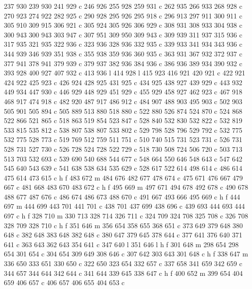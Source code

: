 {{   237 930 239 930 241 929 c
   246 926 255 928 259 931 c
   262 935 266 933 268 928 c
   270 923 274 922 282 925 c
   290 928 295 926 295 918 c
   296 913 297 911 300 911 c
   305 910 309 915 306 921 c
   305 924 305 926 306 929 c
   308 931 308 933 304 938 c
   300 943 300 943 303 947 c
   307 951 309 950 309 943 c
   309 939 311 937 315 936 c
   317 935 321 935 322 936 c
   323 936 328 936 332 935 c
   339 933 341 934 343 936 c
   344 939 346 939 351 938 c
   355 938 359 936 360 935 c
   363 931 367 932 372 937 c
   377 941 378 941 379 939 c
   379 937 382 936 384 936 c
   386 936 389 934 390 932 c
   393 928 400 927 407 932 c
   413 936 l
   414 928 l
   415 923 416 921 420 921 c
   422 921 424 922 425 923 c
   426 924 428 925 431 925 c
   434 925 438 927 439 929 c
   443 932 449 934 447 930 c
   446 929 448 929 451 929 c
   455 929 458 927 462 923 c
   467 918 468 917 474 918 c
   482 920 487 917 486 912 c
   484 907 488 903 495 903 c
   502 903 505 901 505 894 c
   505 889 513 880 518 880 c
   522 880 526 874 524 870 c
   524 868 522 866 521 865 c
   518 863 519 854 523 847 c
   528 840 532 830 532 822 c
   532 819 533 815 535 812 c
   538 807 538 807 533 802 c
   529 798 528 796 529 792 c
   532 775 532 775 528 773 c
   519 769 512 759 511 751 c
   510 740 515 731 523 731 c
   526 731 528 731 527 730 c
   526 728 524 728 522 729 c
   518 730 508 724 506 720 c
   503 713 513 703 532 693 c
   539 690 540 688 544 677 c
   548 664 550 646 548 643 c
   547 642 545 640 543 639 c
   541 638 538 634 535 629 c
   528 617 522 614 498 614 c
   486 614 475 614 473 615 c
   h f
   483 672 m
   484 676 482 677 478 674 c
   475 671 476 667 479 667 c
   481 668 483 670 483 672 c
   h f
   495 669 m
   497 671 494 678 492 678 c
   490 678 488 677 487 676 c
   486 674 486 673 488 670 c
   491 667 493 666 495 669 c
   h f
   444 697 m
   444 699 443 701 441 701 c
   438 701 437 699 438 696 c
   439 693 444 693 444 697 c
   h f
   328 710 m
   330 713 328 714 326 711 c
   324 709 324 708 325 708 c
   326 708 328 709 328 710 c
   h f
   351 646 m
   356 654 358 655 368 651 c
   373 649 379 648 380 648 c
   382 648 383 648 382 648 c
   380 647 379 645 378 644 c
   377 641 376 640 371 641 c
   363 643 362 643 354 641 c
   347 640 l
   351 646 l
   h f
   301 648 m
   298 654 298 654 301 654 c
   304 654 309 649 308 646 c
   307 642 303 643 301 648 c
   h f
   338 647 m
   336 650 333 651 330 650 c
   322 650 323 654 332 657 c
   337 658 341 659 342 659 c
   344 657 344 644 342 644 c
   341 644 339 645 338 647 c
   h f
   400 652 m
   399 654 404 659 406 657 c
   406 657 406 655 404 653 c
}}
